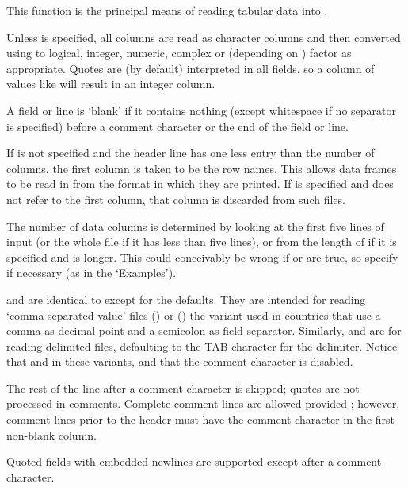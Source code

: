 \begin{Details}\relax
This function is the principal means of reading tabular data into \R{}.

Unless  is specified, all columns are read as
character columns and then converted using 
to logical, integer, numeric, complex or (depending on )
factor as appropriate.  Quotes are (by default) interpreted in all
fields, so a column of values like  will result in an
integer column.

A field or line is `blank' if it contains nothing (except
whitespace if no separator is specified) before a comment character or
the end of the field or line.

If  is not specified and the header line has one less
entry than the number of columns, the first column is taken to be the
row names.  This allows data frames to be read in from the format in
which they are printed.  If  is specified and does
not refer to the first column, that column is discarded from such files.

The number of data columns is determined by looking at the first five lines
of input (or the whole file if it has less than five lines), or from
the length of  if it is specified and
is longer.  This could conceivably be wrong if  or
 are true, so specify  if
necessary (as in the `Examples').

 and  are identical to
 except for the defaults.  They are intended for
reading `comma separated value' files () or
() the variant used in countries that use a comma as
decimal point and a semicolon as field separator.  Similarly,
 and  are for reading delimited
files, defaulting to the TAB character for the delimiter.  Notice that
 and  in these variants, and
that the comment character is disabled.

The rest of the line after a comment character is skipped; quotes
are not processed in comments.  Complete comment lines are allowed
provided ; however, comment lines prior
to the header must have the comment character in the first non-blank
column.

Quoted fields with embedded newlines are supported except after a
comment character.
\end{Details}
